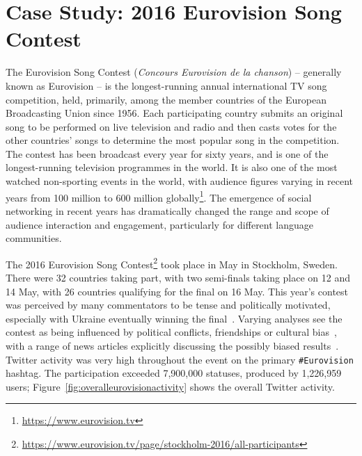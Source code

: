 \section{Case Study: 2016 Eurovision Song Contest}\label{eurovisioncasestudy}

The Eurovision Song Contest ({\emph{Concours Eurovision de la
chanson}}) -- generally known as Eurovision -- is the longest-running
annual international TV song competition, held, primarily, among the
member countries of the European Broadcasting Union since 1956. Each
participating country submits an original song to be performed on live
television and radio and then casts votes for the other countries'
songs to determine the most popular song in the competition. The
contest has been broadcast every year for sixty years, and is one of
the longest-running television programmes in the world. It is also one
of the most watched non-sporting events in the world, with audience
figures varying in recent years from 100 million to 600 million
globally\footnote{\url{https://www.eurovision.tv}}. The emergence of
social networking in recent years has dramatically changed the range
and scope of audience interaction and engagement, particularly for
different language communities.

The 2016 Eurovision Song
Contest\footnote{\url{https://www.eurovision.tv/page/stockholm-2016/all-participants}}
took place in May in Stockholm, Sweden. There were 32 countries taking
part, with two semi-finals taking place on 12 and 14 May, with 26
countries qualifying for the final on 16 May. This year’s contest was
perceived by many commentators to be tense and politically motivated,
especially with Ukraine eventually winning the
final~\cite{telegrapheuroboycott:2016}. Varying analyses see the
contest as being influenced by political conflicts, friendships or
cultural
bias~\cite{ginsburgh+noury:2008,charron:2013,blangiardo+baio:2014,budzinski+pannicke:2016},
with a range of news articles explicitly discussing the possibly
biased results~\cite{telegrapheurobias:2016}.  Twitter activity was
very high throughout the event on the primary {\texttt{\#Eurovision}}
hashtag. The participation exceeded 7,900,000 statuses, produced by
1,226,959 users; Figure~\ref{fig:overalleurovisionactivity} shows the
overall Twitter activity.

